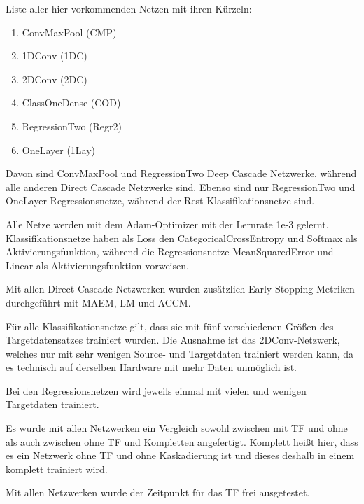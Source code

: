 
Liste aller hier vorkommenden Netzen mit ihren Kürzeln:

\begin{enumerate}
    \item ConvMaxPool (CMP)
    \item 1DConv (1DC)
    \item 2DConv (2DC)
    \item ClassOneDense (COD)
    \item RegressionTwo (Regr2)
    \item OneLayer (1Lay)
\end{enumerate}

Davon sind ConvMaxPool und RegressionTwo Deep Cascade Netzwerke, während alle anderen Direct Cascade Netzwerke sind. 
Ebenso sind nur RegressionTwo und OneLayer Regressionsnetze, während der Rest Klassifikationsnetze sind. 

Alle Netze werden mit dem Adam-Optimizer mit der Lernrate 1e-3 gelernt. Klassifikationsnetze haben als Loss den 
CategoricalCrossEntropy und Softmax als Aktivierungsfunktion, während die Regressionsnetze MeanSquaredError und Linear als 
Aktivierungsfunktion vorweisen. 

Mit allen Direct Cascade Netzwerken wurden zusätzlich Early Stopping Metriken durchgeführt mit MAEM, LM und ACCM. 

Für alle Klassifikationsnetze gilt, dass sie mit fünf verschiedenen Größen des Targetdatensatzes trainiert wurden. Die Ausnahme ist das 
2DConv-Netzwerk, welches nur mit sehr wenigen Source- und Targetdaten trainiert werden kann, da es technisch auf derselben Hardware mit mehr 
Daten unmöglich ist. 

Bei den Regressionsnetzen wird jeweils einmal mit vielen und wenigen Targetdaten trainiert. 


Es wurde mit allen Netzwerken ein Vergleich sowohl zwischen mit TF und ohne als auch zwischen ohne TF und Kompletten angefertigt. 
Komplett heißt hier, dass es ein Netzwerk ohne TF und ohne Kaskadierung ist und dieses deshalb in einem komplett trainiert wird. 

Mit allen Netzwerken wurde der Zeitpunkt für das TF frei ausgetestet. 

